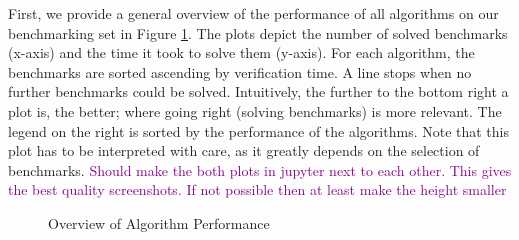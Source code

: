 First, we provide a general overview of the performance of all algorithms on our benchmarking set in Figure \ref{fig:AlgoPerformance}.
The plots depict the number of solved benchmarks (x-axis) and the time it took to solve them (y-axis). 
For each algorithm, the benchmarks are sorted ascending by verification time. A line stops when no further benchmarks could be solved.
Intuitively, the further to the bottom right a plot is, the better; where going right (solving benchmarks) is more relevant.
The legend on the right is sorted by the performance of the algorithms.
Note that this plot has to be interpreted with care, as it greatly depends on the selection of benchmarks.
\textcolor{purple}{Should make the both plots in jupyter next to each other. This gives the best quality screenshots. If not possible then at least make the height smaller}
\begin{figure}
    \centering
    \qquad
    \caption[Overview of Algorithm Performance]{Overview of Algorithm Performance}%
    \label{fig:AlgoPerformance}
\end{figure}

